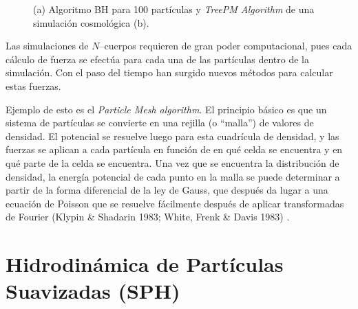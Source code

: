 \documentclass[a4paper,openright,12pt]{book}
\begin{document}
\begin{figure}
\centering
  \caption{\footnotesize{(a) Algoritmo BH para 100 partículas y \textit{TreePM Algorithm} de una simulación cosmológica (b).}}
  \label{fig 2.1}
\end{figure}

Las simulaciones de $N$--cuerpos requieren de gran poder computacional, pues cada cálculo de fuerza se efectúa para cada una de las partículas dentro de la simulación. Con el paso del tiempo han surgido nuevos métodos para calcular estas fuerzas. 

Ejemplo de esto es el \textit{Particle Mesh algorithm}. El principio básico es que un sistema de partículas se convierte en una rejilla (o ``malla'') de valores de densidad. El potencial se resuelve luego para esta cuadrícula de densidad, y las fuerzas se aplican a cada partícula en función de en qué celda se encuentra y en qué parte de la celda se encuentra. Una vez que se encuentra la distribución de densidad, la energía potencial de cada punto en la malla se puede determinar a partir de la forma diferencial de la ley de Gauss, que después da lugar a una ecuación de Poisson que se resuelve fácilmente después de aplicar transformadas de Fourier (Klypin \& Shadarin 1983; White, Frenk \& Davis 1983) \cite{b5.1, b5.2}.




\section{Hidrodinámica de Partículas Suavizadas (SPH)}
\end{document}
